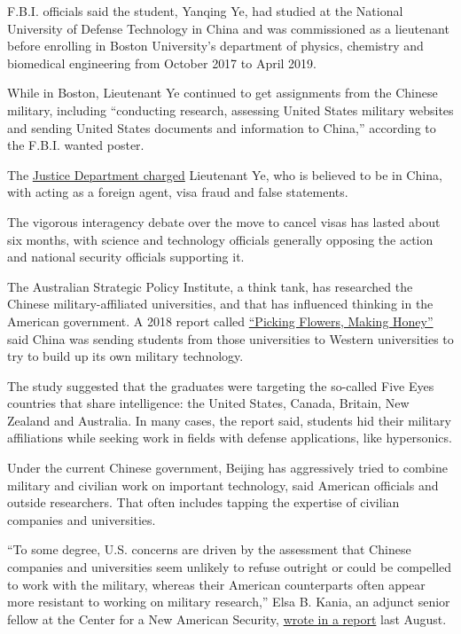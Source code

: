 F.B.I. officials said the student, Yanqing Ye, had studied at the
National University of Defense Technology in China and was commissioned
as a lieutenant before enrolling in Boston University's department of
physics, chemistry and biomedical engineering from October 2017 to April
2019.

While in Boston, Lieutenant Ye continued to get assignments from the
Chinese military, including ``conducting research, assessing United
States military websites and sending United States documents and
information to China,'' according to the F.B.I. wanted poster.

The
\href{https://www.justice.gov/opa/pr/harvard-university-professor-and-two-chinese-nationals-charged-three-separate-china-related}{Justice
Department charged} Lieutenant Ye, who is believed to be in China, with
acting as a foreign agent, visa fraud and false statements.

The vigorous interagency debate over the move to cancel visas has lasted
about six months, with science and technology officials generally
opposing the action and national security officials supporting it.

The Australian Strategic Policy Institute, a think tank, has researched
the Chinese military-affiliated universities, and that has influenced
thinking in the American government. A 2018 report called
\href{https://www.aspi.org.au/report/picking-flowers-making-honey}{``Picking
Flowers, Making Honey''} said China was sending students from those
universities to Western universities to try to build up its own military
technology.

The study suggested that the graduates were targeting the so-called Five
Eyes countries that share intelligence: the United States, Canada,
Britain, New Zealand and Australia. In many cases, the report said,
students hid their military affiliations while seeking work in fields
with defense applications, like hypersonics.

Under the current Chinese government, Beijing has aggressively tried to
combine military and civilian work on important technology, said
American officials and outside researchers. That often includes tapping
the expertise of civilian companies and universities.

``To some degree, U.S. concerns are driven by the assessment that
Chinese companies and universities seem unlikely to refuse outright or
could be compelled to work with the military, whereas their American
counterparts often appear more resistant to working on military
research,'' Elsa B. Kania, an adjunct senior fellow at the Center for a
New American Security,
\href{https://www.cnas.org/publications/commentary/in-military-civil-fusion-china-is-learning-lessons-from-the-united-states-and-starting-to-innovate}{wrote
in a report} last August.

